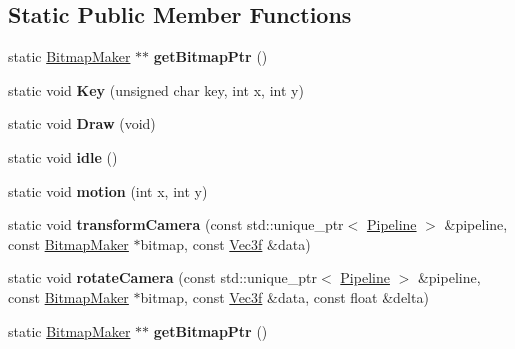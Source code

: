 \subsection*{Static Public Member Functions}
\begin{DoxyCompactItemize}
\item 
static \hyperlink{class_bitmap_maker}{Bitmap\+Maker} $\ast$$\ast$ {\bfseries get\+Bitmap\+Ptr} ()\hypertarget{class_bitmap_maker_a552fe60cbd4bb0cee2abab954d3d035a}{}\label{class_bitmap_maker_a552fe60cbd4bb0cee2abab954d3d035a}

\item 
static void {\bfseries Key} (unsigned char key, int x, int y)\hypertarget{class_bitmap_maker_a5419c10622f3287678904cfe33bded58}{}\label{class_bitmap_maker_a5419c10622f3287678904cfe33bded58}

\item 
static void {\bfseries Draw} (void)\hypertarget{class_bitmap_maker_a7fbe404cf3772e9f00af0f80b8afa781}{}\label{class_bitmap_maker_a7fbe404cf3772e9f00af0f80b8afa781}

\item 
static void {\bfseries idle} ()\hypertarget{class_bitmap_maker_a0103e8746802fc4f2af3ce16a9a11613}{}\label{class_bitmap_maker_a0103e8746802fc4f2af3ce16a9a11613}

\item 
static void {\bfseries motion} (int x, int y)\hypertarget{class_bitmap_maker_af7d3a02f076e5ac261fc12ab66be9519}{}\label{class_bitmap_maker_af7d3a02f076e5ac261fc12ab66be9519}

\item 
static void {\bfseries transform\+Camera} (const std\+::unique\+\_\+ptr$<$ \hyperlink{class_pipeline}{Pipeline} $>$ \&pipeline, const \hyperlink{class_bitmap_maker}{Bitmap\+Maker} $\ast$bitmap, const \hyperlink{class_vec3}{Vec3f} \&data)\hypertarget{class_bitmap_maker_a8ea46e4e115677c1b5b52decb1e516a9}{}\label{class_bitmap_maker_a8ea46e4e115677c1b5b52decb1e516a9}

\item 
static void {\bfseries rotate\+Camera} (const std\+::unique\+\_\+ptr$<$ \hyperlink{class_pipeline}{Pipeline} $>$ \&pipeline, const \hyperlink{class_bitmap_maker}{Bitmap\+Maker} $\ast$bitmap, const \hyperlink{class_vec3}{Vec3f} \&data, const float \&delta)\hypertarget{class_bitmap_maker_a0bcc8f4a244f10901f4326ff020bb5a4}{}\label{class_bitmap_maker_a0bcc8f4a244f10901f4326ff020bb5a4}

\item 
static \hyperlink{class_bitmap_maker}{Bitmap\+Maker} $\ast$$\ast$ {\bfseries get\+Bitmap\+Ptr} ()\hypertarget{class_bitmap_maker_a552fe60cbd4bb0cee2abab954d3d035a}{}\label{class_bitmap_maker_a552fe60cbd4bb0cee2abab954d3d035a}


\end{DoxyCompactItemize}
